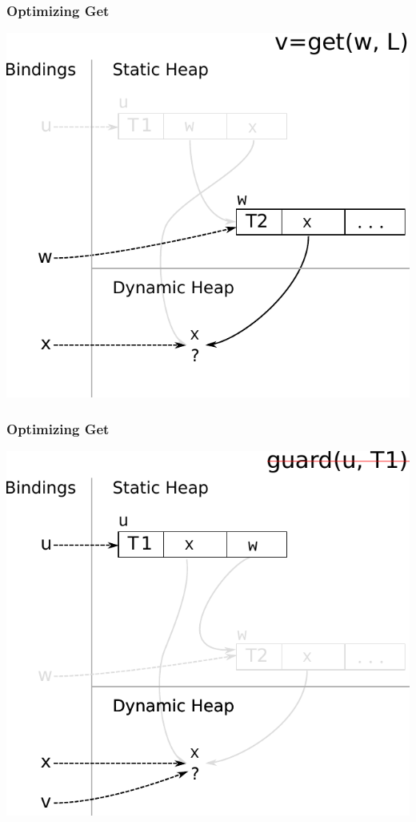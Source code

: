 \documentclass[utf8x]{beamer}
\begin{document}
\begin{frame}[plain]
  \frametitle{Optimizing Get}
  \includegraphics[scale=0.8]{figures/opt_get1}
\end{frame}

\begin{frame}[plain]
  \frametitle{Optimizing Get}
  \includegraphics[scale=0.8]{figures/opt_get2}
\end{frame}
\end{document}
